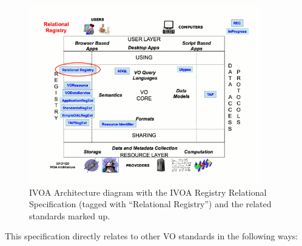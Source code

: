 \documentclass[11pt,a4paper]{ivoa}
\begin{document}
\begin{figure}[thm]
\begin{center}
\includegraphics[width=0.9\textwidth]{RegTAP-arch.png}
\end{center}

\caption{IVOA Architecture
diagram with the IVOA Registry Relational Specification (tagged with
``Relational Registry'') and the related standards marked up.}
\end{figure}

This specification directly relates to other VO standards in the
following ways:
\end{document}
